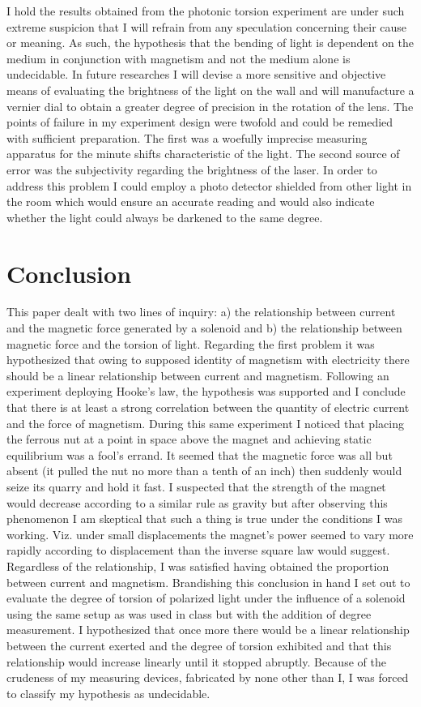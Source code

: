 \documentclass{article}
\begin{document}
I hold the results obtained from the photonic torsion experiment are under such extreme suspicion that I will refrain from any speculation concerning their cause or meaning. As such, the hypothesis that the bending of light is dependent on the medium in conjunction with magnetism and not the medium alone is undecidable. In future researches I will devise a more sensitive and objective means of evaluating the brightness of the light on the wall and will manufacture a vernier dial to obtain a greater degree of precision in the rotation of the lens. The points of failure in my experiment design were twofold and could be remedied with sufficient preparation. The first was a woefully imprecise measuring apparatus for the minute shifts characteristic of the light. The second source of error was the subjectivity regarding the brightness of the laser. In order to address this problem I could employ a photo detector shielded from other light in the room which would ensure an accurate reading and would also indicate whether the light could always be darkened to the same degree.  
\section{Conclusion}
This paper dealt with two lines of inquiry: a) the relationship between current and the magnetic force generated by a solenoid and b) the relationship between magnetic force and the torsion of light. Regarding the first problem it was hypothesized that owing to supposed identity of magnetism with electricity there should be a linear relationship between current and magnetism. Following an experiment deploying Hooke's law, the hypothesis was supported and I conclude that there is at least a strong correlation between the quantity of electric current and the force of magnetism. During this same experiment I noticed that placing the ferrous nut at a point in space above the magnet and achieving static equilibrium was a fool's errand. It seemed that the magnetic force was all but absent (it pulled the nut no more than a tenth of an inch) then suddenly would seize its quarry and hold it fast. I suspected that the strength of the magnet would decrease according to a similar rule as gravity but after observing this phenomenon I am skeptical that such a thing is true under the conditions I was working. Viz. under small displacements the magnet's power seemed to vary more rapidly according to displacement than the inverse square law would suggest. Regardless of the relationship, I was satisfied having obtained the proportion between current and magnetism. Brandishing this conclusion in hand I set out to evaluate the degree of torsion of polarized light under the influence of a solenoid using the same setup as was used in class but with the addition of degree measurement. I hypothesized that once more there would be a linear relationship between the current exerted and the degree of torsion exhibited and that this relationship would increase linearly until it stopped abruptly. Because of the crudeness of my measuring devices, fabricated by none other than I, I was forced to classify my hypothesis as undecidable. 
\end{document}
